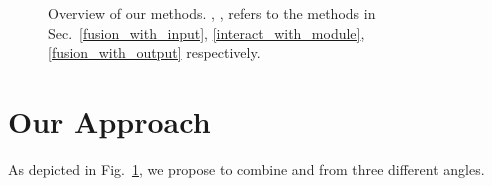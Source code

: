 \begin{figure}[!t]
\centering
{}
\hspace{.5in}
\vspace{-3mm}
\caption{Overview of our methods. , ,  refers to the methods in
Sec.~\ref{fusion_with_input}, \ref{interact_with_module}, \ref{fusion_with_output} respectively.}
\label{fig_overview}
\vspace{-5mm}
\end{figure}

\section{Our Approach}
\vspace{-2mm} As depicted in Fig.~\ref{fig_overview}, we propose  to combine \NNs and \REs from three different angles.


